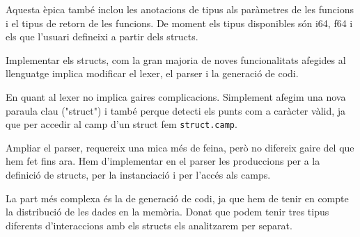 ﻿\documentclass{article}
\begin{document}
Aquesta èpica també inclou les anotacions de tipus als paràmetres de les funcions
i el tipus de retorn de les funcions. De moment els tipus disponibles són i64,
f64 i els que l'usuari defineixi a partir dels structs.

Implementar els structs, com la gran majoria de noves funcionalitats afegides al
llenguatge implica modificar el lexer, el parser i la generació de codi. 

En quant al lexer no implica gaires complicacions. Simplement afegim una nova
paraula clau ("struct") i també perque detecti els punts com a caràcter vàlid,
ja que per accedir al camp d'un struct fem \texttt{struct.camp}.

Ampliar el parser, requereix una mica més de feina, però no difereix gaire del
que hem fet fins ara. Hem d'implementar en el parser les produccions per a la
definició de structs, per la instanciació i per l'accés als camps.

La part més complexa és la de generació de codi, ja que hem de tenir en compte
la distribució de les dades en la memòria. Donat que podem tenir tres tipus
diferents d'interaccions amb els structs els analitzarem per separat.
\end{document}
